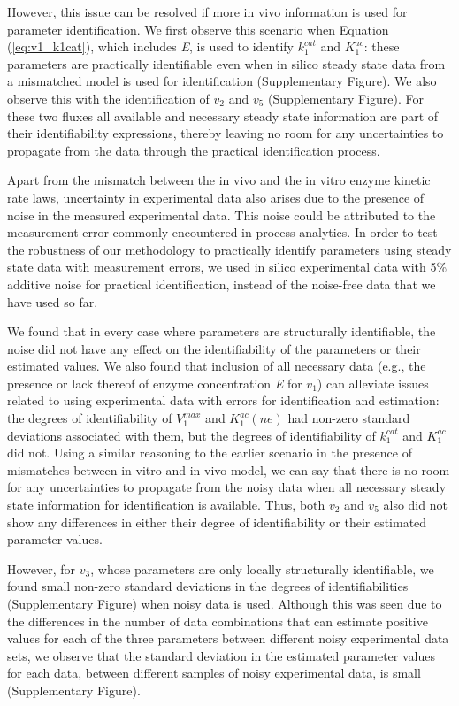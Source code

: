 \documentclass[10pt]{article}
\begin{document}
	However, this issue can be resolved if more in vivo information is used for parameter identification. We first observe this scenario when Equation (\ref{eq:v1_k1cat}), which includes \textit{E}, is used to identify $k_1^{cat}$ and $K_1^{ac}$: these parameters are practically identifiable even when in silico steady state data from a mismatched model is used for identification (Supplementary Figure). We also observe this with the identification of $v_2$ and $v_5$ (Supplementary Figure). For these two fluxes all available and necessary steady state information are part of their identifiability expressions, thereby leaving no room for any uncertainties to propagate from the data through the practical identification process.
	
	Apart from the mismatch between the in vivo and the in vitro enzyme kinetic rate laws, uncertainty in experimental data also arises due to the presence of noise in the measured experimental data. This noise could be attributed to the measurement error commonly encountered in process analytics. In order to test the robustness of our methodology to practically identify parameters using steady state data with measurement errors, we used in silico experimental data with 5\% additive noise for practical identification, instead of the noise-free data that we have used so far. 
	
	We found that in every case where parameters are structurally identifiable, the noise did not have any effect on the identifiability of the parameters or their estimated values. We also found that inclusion of all necessary data (e.g., the presence or lack thereof of enzyme concentration \textit{E} for $v_1$) can alleviate issues related to using experimental data with errors for identification and estimation: the degrees of identifiability of $V_1^{max}$ and $K_1^{ac}(ne)$ had non-zero standard deviations associated with them, but the degrees of identifiability of $k_1^{cat}$ and $K_1^{ac}$ did not. Using a similar reasoning to the earlier scenario in the presence of mismatches between in vitro and in vivo model, we can say that there is no room for any uncertainties to propagate from the noisy data when all necessary steady state information for identification is available. Thus, both $v_2$ and $v_5$ also did not show any differences in either their degree of identifiability or their estimated parameter values.
	
	However, for $v_3$, whose parameters are only locally structurally identifiable, we found small non-zero standard deviations in the degrees of identifiabilities (Supplementary Figure) when noisy data is used. Although this was seen due to the differences in the number of data combinations that can estimate positive values for each of the three parameters between different noisy experimental data sets, we observe that the standard deviation in the estimated parameter values for each data, between different samples of noisy experimental data, is small (Supplementary Figure). 
	
\end{document}
